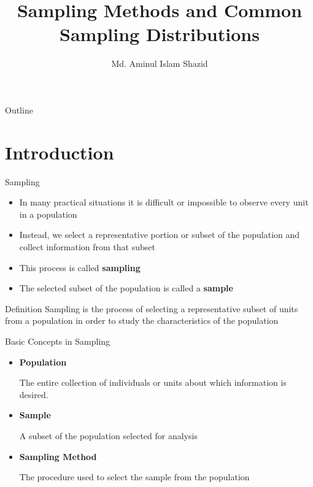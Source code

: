 \documentclass[12pt, aspectratio=169]{beamer}
\title{Sampling Methods and Common Sampling Distributions}
\author{Md. Aminul Islam Shazid}
\date{}
\begin{document}
    {
		\addtocounter{framenumber}{-2}    %

		\begin{frame}
			\titlepage
		\end{frame}

		\begin{frame}{Outline}
            \vfill
			\tableofcontents[subsectionstyle=hide]
            \vfill
		\end{frame}
	}


	\section{Introduction}
    \begin{frame}{Sampling}
        \begin{itemize}
            \item In many practical situations it is difficult or impossible to observe every unit in a population

            \item Instead, we select a representative portion or subset of the population and collect information from that subset

            \item This process is called \textbf{sampling}

            \item The selected subset of the population is called a \textbf{sample}
            \end{itemize}

        \begin{block}{Definition}
            Sampling is the process of selecting a representative subset of units from a population in order to study the characteristics of the population
        \end{block}
    \end{frame}


    \begin{frame}{Basic Concepts in Sampling}
        \begin{itemize}
            \item \textbf{Population}

            The entire collection of individuals or units about which information is desired.

            \item \textbf{Sample}

            A subset of the population selected for analysis

            \item \textbf{Sampling Method}

            The procedure used to select the sample from the population
        \end{itemize}
    \end{frame}
\end{document}
